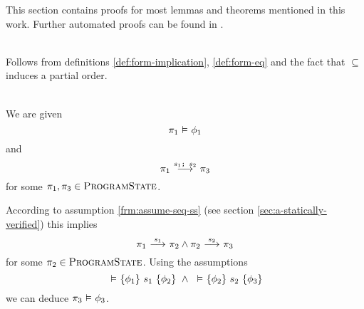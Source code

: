 This section contains proofs for most lemmas and theorems mentioned in this work.
Further automated proofs can be found in \cite{olydisGitHub}.

\begin{proofatend}~\\
    Follows from definitions \ref{def:form-implication}, \ref{def:form-eq} and the fact that $\subseteq$ induces a partial order.
\end{proofatend}

\begin{proofatend}~\\
    We are given 
    \begin{displaymath}
    \evalphiGen{\pi_1}{\phi_1}
    \end{displaymath}
    and
    \begin{displaymath}
    \sstepConsume{\sSeq{$s_1$}{$s_2$}}{\pi_1}{\pi_3}
    \end{displaymath}
    for some $\pi_1, \pi_3 \in \setProgramState$.
    
    According to assumption \ref{frm:assume-seq-ss} (see section \ref{sec:a-statically-verified}) this implies
    \begin{displaymath}
    \sstepConsume{s_1}{\pi_1}{\pi_2} \wedge \sstepConsume{s_2}{\pi_2}{\pi_3}
    \end{displaymath}
    for some $\pi_2 \in \setProgramState$.
    Using the assumptions
    \begin{displaymath}
    \tHoare{}{\phi_1} {s_1} {\phi_2} ~\wedge~ \tHoare{}{\phi_2} {s_2} {\phi_3}
    \end{displaymath}
    we can deduce $\evalphiGen{\pi_3}{\phi_3}$.
\end{proofatend}

